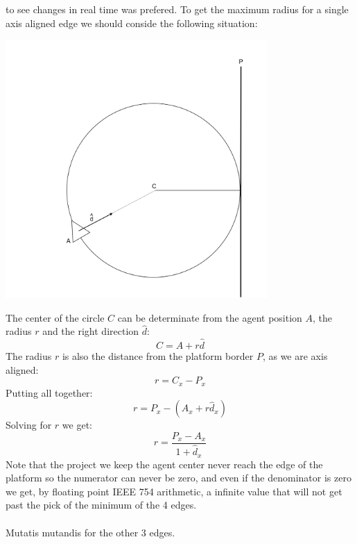 \documentclass[12pt, a4paper]{article}
\begin{document}
to see changes in real time was prefered.
\clearpage
\noindent To get the maximum radius for a single axis aligned edge we should conside the following situation:
\begin{center}
    \centering
    \includegraphics[width=0.75\textwidth]{draw.png}
\end{center}
The center of the circle $C$ can be determinate from the agent position $A$, the radius $r$ and the right direction $\hat{d}$:
\[
C = A + r \hat{d}
\]
The radius $r$ is also the distance from the platform border $P$, as we are axis aligned:
\[
r = C_x-P_x
\]
Putting all together:
\[
r = P_x - (A_x + r \hat{d}_x)
\]
Solving for $r$ we get:
\[
r = \dfrac{P_x-A_x}{1+\hat{d}_x}
\]
Note that the project we keep the agent center never reach the edge of the platform so the numerator can never be zero, and even if the denominator is zero we get, by floating point IEEE 754 arithmetic, a infinite value that will not get 
past the pick of the minimum of the 4 edges.\\\\
Mutatis mutandis for the other 3 edges.
\end{document}
